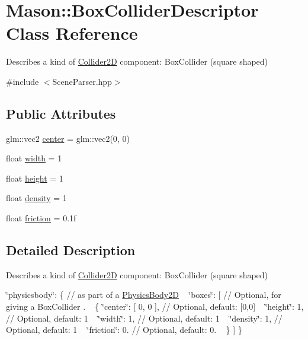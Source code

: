 \hypertarget{class_mason_1_1_box_collider_descriptor}{}\section{Mason\+:\+:Box\+Collider\+Descriptor Class Reference}
\label{class_mason_1_1_box_collider_descriptor}


Describes a kind of \hyperlink{class_mason_1_1_collider2_d}{Collider2D} component\+: Box\+Collider (square shaped) ~\newline
  




{\ttfamily \#include $<$Scene\+Parser.\+hpp$>$}

\subsection*{Public Attributes}
\begin{DoxyCompactItemize}
\item 
glm\+::vec2 \hyperlink{class_mason_1_1_box_collider_descriptor_a76bdf93a5c562a89e1f513b2f4ee7a65}{center} = glm\+::vec2(0, 0)
\item 
float \hyperlink{class_mason_1_1_box_collider_descriptor_ae147e1798e9ef8855faaf51ce4bac9c4}{width} = 1
\item 
float \hyperlink{class_mason_1_1_box_collider_descriptor_a7ed17142f44ec7337d38b34674b9e292}{height} = 1
\item 
float \hyperlink{class_mason_1_1_box_collider_descriptor_a084463ca0e2073f923ed8d58f62129a6}{density} = 1
\item 
float \hyperlink{class_mason_1_1_box_collider_descriptor_aa951d5f120f8f3d658d8265ed0b4e6e0}{friction} = 0.\+1f
\end{DoxyCompactItemize}


\subsection{Detailed Description}
Describes a kind of \hyperlink{class_mason_1_1_collider2_d}{Collider2D} component\+: Box\+Collider (square shaped) ~\newline
 

\char`\"{}physicsbody\char`\"{}\+: \{ // as part of a \hyperlink{class_mason_1_1_physics_body2_d}{Physics\+Body2D} ~\newline
 \char`\"{}boxes\char`\"{}\+: \mbox{[} // Optional, for giving a Box\+Collider . ~\newline
 \{ \char`\"{}center\char`\"{}\+: \mbox{[} 0, 0 \mbox{]}, // Optional, default\+: \mbox{[}0,0\mbox{]} ~\newline
 \char`\"{}height\char`\"{}\+: 1, // Optional, default\+: 1 ~\newline
 \char`\"{}width\char`\"{}\+: 1, // Optional, default\+: 1 ~\newline
 \char`\"{}density\char`\"{}\+: 1, // Optional, default\+: 1 ~\newline
 \char`\"{}friction\char`\"{}\+: 0. // Optional, default\+: 0. ~\newline
 \} \mbox{]} \} 

